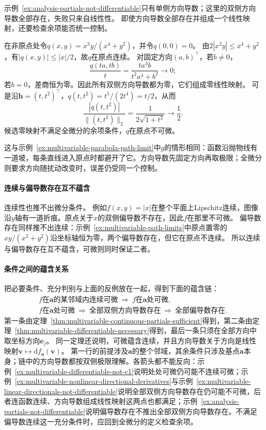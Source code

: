 示例~\ref{ex:analysis-partials-not-differentiable}只有单侧方向导数；这里的双侧方向导数全部存在，失败只来自线性性。
即使方向导数全部存在并组成一个线性映射，还要检查余项能否统一控制。
\begin{example}[方向导数全为零仍不可微]
\label{ex:multivariable-linear-directionals-not-differentiable}
在非原点处令$q(x,y)=x^3y/(x^4+y^2)$，并令$q(0,0)=0$。
由$2|x^2y|\leq x^4+y^2$，有$|q(x,y)|\leq|x|/2$，故$q$在原点连续。
对固定方向$(a,b)^\top$，若$b\neq0$，
\[
 \frac{q(ta,tb)}t=\frac{t a^3b}{t^2a^4+b^2}\longrightarrow0;
\]
若$b=0$，差商恒为零。因此所有双侧方向导数都为零，它们组成零线性映射。
可是沿$\bm h=(t,t^2)^\top$，$q(t,t^2)=t^5/(2t^4)=t/2$，从而
\[
 \frac{|q(t,t^2)|}{\lVert(t,t^2)\rVert_2}
 =\frac1{2\sqrt{1+t^2}}\longrightarrow\frac12.
\]
候选零映射不满足全微分的余项条件，$q$在原点不可微。
\end{example}

这与示例~\ref{ex:multivariable-parabola-path-limit}中$g$的情形相同：函数沿抛物线有一道坡，每条直线进入原点时都避开了它。方向导数先固定方向再取极限；全微分则要求方向随扰动改变时，误差仍受同一个控制。

\paragraph{连续与偏导数存在互不蕴含}
连续性也推不出微分条件。
例如$f(x,y)=|x|$在整个平面上Lipschitz连续，图像沿$y$轴有一道折痕。原点关于$x$的双侧偏导数不存在，因此$f$在那里不可微。
偏导数存在同样推不出连续：示例~\ref{ex:multivariable-path-limits}中原点置零的$xy/(x^2+y^2)$沿坐标轴恒为零，两个偏导数存在，但它在原点不连续。
所以连续与偏导数存在互不蕴含，可微则同时保证二者。

\paragraph{条件之间的蕴含关系}
把必要条件、充分判别与上面的反例放在一起，得到下面的蕴含链：
\[
 \begin{gathered}
 f\text{在}\bm a\text{的某邻域内连续可微}
 \ \Longrightarrow\ f\text{在}\bm a\text{处可微},\\
 f\text{在}\bm a\text{处可微}
 \ \Longrightarrow\ \text{全部双侧方向导数存在}
 \ \Longrightarrow\ \text{全部偏导数存在}.
 \end{gathered}
\]
第一条由定理~\ref{thm:multivariable-continuous-partials-sufficient}得到，第二条由定理~\ref{thm:multivariable-differentiable-necessary}得到，最后一条只须在全部方向中取坐标方向$\bm e_j$。
同一定理还说明，可微蕴含连续，并且方向导数关于方向是线性映射$\bm v\mapsto\mathrm df_{\bm a}(\bm v)$。
第一行的前提涉及$\bm a$的整个邻域，其余条件只涉及基点$\bm a$本身；链中的方向导数都按双侧极限理解。各箭头都不能反向：示例~\ref{ex:multivariable-differentiable-not-c1}说明处处可微仍可能不连续可微；示例~\ref{ex:multivariable-nonlinear-directional-derivatives}与示例~\ref{ex:multivariable-linear-directionals-not-differentiable}说明全部双侧方向导数存在仍可能不可微，后者连函数连续、方向导数组成线性映射这两点也都满足；示例~\ref{ex:analysis-partials-not-differentiable}说明偏导数存在不推出全部双侧方向导数存在。不满足偏导数连续这一充分条件时，应回到全微分的定义检查余项。

